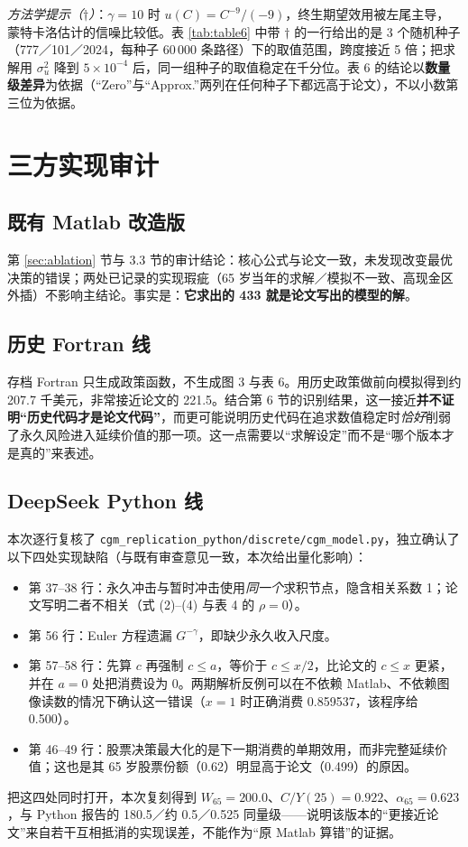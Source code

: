 \documentclass[UTF8,a4paper,11pt,fontset=fandol]{ctexart}
\newcommand{\su}{\sigma_u^2}
\begin{document}
\emph{方法学提示（\(\dagger\)）}：\(\gamma=10\) 时 \(u(C)=C^{-9}/(-9)\)，终生期望效用被左尾主导，蒙特卡洛估计的信噪比较低。表 \ref{tab:table6} 中带 \(\dagger\) 的一行给出的是 3 个随机种子（777／101／2024，每种子 60\,000 条路径）下的取值范围，跨度接近 5 倍；把求解用 \(\su\) 降到 \(5\times10^{-4}\) 后，同一组种子的取值稳定在千分位。表 6 的结论以\textbf{数量级差异}为依据（“Zero”与“Approx.”两列在任何种子下都远高于论文），不以小数第三位为依据。

\section{三方实现审计}

\subsection{既有 Matlab 改造版}
第 \ref{sec:ablation} 节与 3.3 节的审计结论：核心公式与论文一致，未发现改变最优决策的错误；两处已记录的实现瑕疵（65 岁当年的求解／模拟不一致、高现金区外插）不影响主结论。事实是：\textbf{它求出的 433 就是论文写出的模型的解}。

\subsection{历史 Fortran 线}
存档 Fortran 只生成政策函数，不生成图 3 与表 6。用历史政策做前向模拟得到约 207.7 千美元，非常接近论文的 221.5。结合第 6 节的识别结果，这一接近\textbf{并不证明“历史代码才是论文代码”}，而更可能说明历史代码在追求数值稳定时\emph{恰好}削弱了永久风险进入延续价值的那一项。这一点需要以“求解设定”而不是“哪个版本才是真的”来表述。

\subsection{DeepSeek Python 线}
本次逐行复核了 \texttt{cgm\_replication\_python/discrete/cgm\_model.py}，独立确认了以下四处实现缺陷（与既有审查意见一致，本次给出量化影响）：
\begin{itemize}[leftmargin=1.6em,itemsep=1pt]
\item 第 37--38 行：永久冲击与暂时冲击使用\emph{同一个}求积节点，隐含相关系数 1；论文写明二者不相关（式 (2)--(4) 与表 4 的 \(\rho=0\)）。
\item 第 56 行：Euler 方程遗漏 \(G^{-\gamma}\)，即缺少永久收入尺度。
\item 第 57--58 行：先算 \(c\) 再强制 \(c\le a\)，等价于 \(c\le x/2\)，比论文的 \(c\le x\) 更紧，并在 \(a=0\) 处把消费设为 0。两期解析反例可以在不依赖 Matlab、不依赖图像读数的情况下确认这一错误（\(x=1\) 时正确消费 0.859537，该程序给 0.500）。
\item 第 46--49 行：股票决策最大化的是下一期消费的单期效用，而非完整延续价值；这也是其 65 岁股票份额（0.62）明显高于论文（0.499）的原因。
\end{itemize}
把这四处同时打开，本次复刻得到 \(W_{65}=200.0\)、\(C/Y(25)=0.922\)、\(\alpha_{65}=0.623\)，与 Python 报告的 180.5／约 0.5／0.525 同量级——说明该版本的“更接近论文”来自若干互相抵消的实现误差，不能作为“原 Matlab 算错”的证据。
\end{document}
